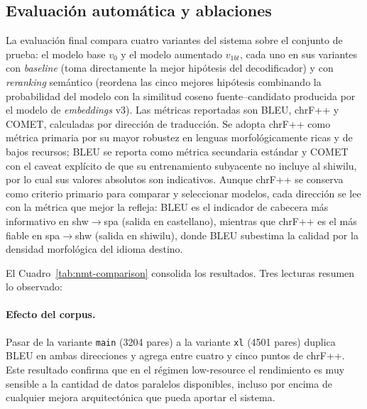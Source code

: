 \documentclass[12pt,a4paper,oneside]{book}
\begin{document}
\subsection{Evaluación automática y ablaciones}\label{nmt-resultados}

La evaluación final compara cuatro variantes del sistema sobre el conjunto de prueba: el modelo base \(v_0\) y el modelo aumentado \(v_{1bt}\), cada uno en sus variantes con \emph{baseline} (toma directamente la mejor hipótesis del decodificador) y con \emph{reranking} semántico (reordena las cinco mejores hipótesis combinando la probabilidad del modelo con la similitud coseno fuente--candidato producida por el modelo de \emph{embeddings} v3). Las métricas reportadas son BLEU, chrF++ y COMET, calculadas por dirección de traducción. Se adopta chrF++ como métrica primaria por su mayor robustez en lenguas morfológicamente ricas y de bajos recursos; BLEU se reporta como métrica secundaria estándar y COMET con el caveat explícito de que su entrenamiento subyacente no incluye al shiwilu, por lo cual sus valores absolutos son indicativos. Aunque chrF++ se conserva como criterio primario para comparar y seleccionar modelos, cada dirección se lee con la métrica que mejor la refleja: BLEU es el indicador de cabecera más informativo en shw\(\rightarrow\)spa (salida en castellano), mientras que chrF++ es el más fiable en spa\(\rightarrow\)shw (salida en shiwilu), donde BLEU subestima la calidad por la densidad morfológica del idioma destino.

\begin{table}[h]
\centering
\caption{Comparación de variantes del sistema sobre el conjunto de prueba (variante \texttt{xl}, 451 pares por dirección). chrF++ es la métrica primaria.}
\label{tab:nmt-comparison}
\resizebox{\linewidth}{!}{}
\end{table}

El Cuadro~\ref{tab:nmt-comparison} consolida los resultados. Tres lecturas resumen lo observado:

\paragraph{Efecto del corpus.} Pasar de la variante \texttt{main} (3204 pares) a la variante \texttt{xl} (4501 pares) duplica BLEU en ambas direcciones y agrega entre cuatro y cinco puntos de chrF++. Este resultado confirma que en el régimen low-resource el rendimiento es muy sensible a la cantidad de datos paralelos disponibles, incluso por encima de cualquier mejora arquitectónica que pueda aportar el sistema.
\end{document}
